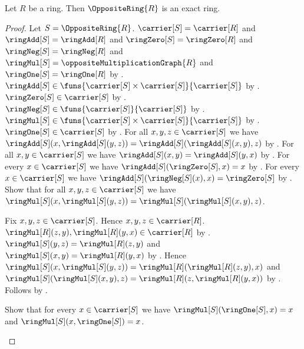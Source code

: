 \begin{theorem}\label{opposite_ring_is_exact}
    Let $R$ be a ring.
    Then $\OppositeRing{R}$ is an exact ring.
\end{theorem}
\begin{proof}
    Let $S=\OppositeRing{R}$.
    $\carrier[S]=\carrier[R]$ and
        $\ringAdd[S]=\ringAdd[R]$ and
        $\ringZero[S]=\ringZero[R]$ and
        $\ringNeg[S]=\ringNeg[R]$ and
        $\ringMul[S]=\oppositeMultiplicationGraph{R}$ and
        $\ringOne[S]=\ringOne[R]$ by
        .
    $\ringAdd[S]\in
        \funs{\carrier[S]\times\carrier[S]}{\carrier[S]}$ by
        .
    $\ringZero[S]\in\carrier[S]$ by .
    $\ringNeg[S]\in\funs{\carrier[S]}{\carrier[S]}$ by
        .
    $\ringMul[S]\in
        \funs{\carrier[S]\times\carrier[S]}{\carrier[S]}$ by
        .
    $\ringOne[S]\in\carrier[S]$ by .
    For all $x,y,z\in\carrier[S]$ we have
        $\ringAdd[S](x,\ringAdd[S](y,z))
            =\ringAdd[S](\ringAdd[S](x,y),z)$ by
        .
    For all $x,y\in\carrier[S]$ we have
        $\ringAdd[S](x,y)=\ringAdd[S](y,x)$ by
        .
    For every $x\in\carrier[S]$ we have
        $\ringAdd[S](\ringZero[S],x)=x$ by
        .
    For every $x\in\carrier[S]$ we have
        $\ringAdd[S](\ringNeg[S](x),x)=\ringZero[S]$ by
        .
    Show that for all $x,y,z\in\carrier[S]$ we have
        $\ringMul[S](x,\ringMul[S](y,z))
            =\ringMul[S](\ringMul[S](x,y),z)$.
    \begin{subproof}
        Fix $x,y,z\in\carrier[S]$.
        Hence $x,y,z\in\carrier[R]$.
        $\ringMul[R](z,y),\ringMul[R](y,x)\in\carrier[R]$ by
            .
        $\ringMul[S](y,z)=\ringMul[R](z,y)$ and
            $\ringMul[S](x,y)=\ringMul[R](y,x)$ by
            .
        Hence
            $\ringMul[S](x,\ringMul[S](y,z))
                =\ringMul[R](\ringMul[R](z,y),x)$ and
            $\ringMul[S](\ringMul[S](x,y),z)
                =\ringMul[R](z,\ringMul[R](y,x))$ by
            .
        Follows by .
    \end{subproof}
    Show that for every $x\in\carrier[S]$ we have
        $\ringMul[S](\ringOne[S],x)=x$ and
        $\ringMul[S](x,\ringOne[S])=x$.
    \begin{subproof}

\end{subproof}
\end{proof}
